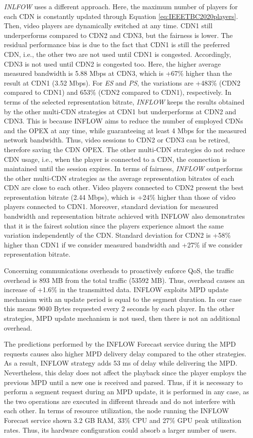 \textit{INLFOW} uses a different approach. Here, the maximum number of players for each CDN is constantly updated through Equation \ref{eq:IEEETBC2020players}. Then, video players are dynamically switched at any time. CDN1 still underperforms compared to CDN2 and CDN3, but the fairness is lower. The residual performance bias is due to the fact that CDN1 is still the preferred CDN, i.e., the other two are not used until CDN1 is congested. Accordingly, CDN3 is not used until CDN2 is congested too. Here, the higher average measured bandwidth is 5.88 Mbps at CDN3, which is +67\% higher than the result at CDN1 (3.52 Mbps). For \textit{ES} and \textit{PS}, the variations are +483\% (CDN2 compared to CDN1) and 653\% (CDN2 compared to CDN1), respectively. In terms of the selected representation bitrate, \textit{INFLOW} keeps the results obtained by the other multi-CDN strategies at CDN1 but underperforms at CDN2 and CDN3. This is because INFLOW aims to reduce the number of employed CDNs and the OPEX at any time, while guaranteeing at least 4 Mbps for the measured network bandwidth. Thus, video sessions to CDN2 or CDN3 can be retired, therefore saving the CDN OPEX. The other multi-CDN strategies do not reduce CDN usage, i.e., when the player is connected to a CDN, the connection is maintained until the session expires. In terms of fairness, \textit{INFLOW} outperforms the other multi-CDN strategies as the average representation bitrates of each CDN are close to each other. Video players connected to CDN2 present the best representation bitrate (2.44 Mbps), which is +24\% higher than those of video players connected to CDN1. Moreover, standard deviation for measured bandwidth and representation bitrate achieved with INFLOW also demonstrates that it is the fairest solution since the players experience almost the same variation independently of the CDN. Standard deviation for CDN2 is +58\% higher than CDN1 if we consider measured bandwidth and +27\% if we consider representation bitrate.

Concerning communications overheads to proactively enforce QoS, the traffic overhead is 893 MB from the total traffic (53592 MB). Thus, overhead causes an increase of +1.6\% in the transmitted data. INFLOW exploits MPD update mechanism with an update period is equal to the segment duration. In our case this means 9040 Bytes requested every 2 seconds by each player. In the other strategies, MPD update mechanism is not used, then there is not an additional overhead.

The predictions performed by the INFLOW Forecast service during the MPD requests causes also higher MPD delivery delay compared to the other strategies. As a result, INFLOW strategy adds 53 ms of delay while delivering the MPD. Nevertheless, this delay does not affect the playback since the player employs the previous MPD until a new one is received and parsed. Thus, if it is necessary to perform a segment request during an MPD update, it is performed in any case, as the two operations are executed in different threads and do not interfere with each other. In terms of resource utilization, the node running the INFLOW Forecast service shown 3.2 GB RAM, 33\% CPU and 27\% GPU peak utilization rates. Thus, its hardware configuration could absorb a larger number of users.


